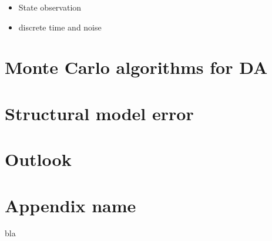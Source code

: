 \documentclass[10pt,a4paper, twocolumn]{article}
\begin{document}
\begin{itemize}
\item State observation
\item discrete time and noise
\end{itemize}




\section{Monte Carlo algorithms for DA}
\section{Structural model error}
\section{Outlook} 

\appendix

\section{Appendix name}











bla
\end{document}
